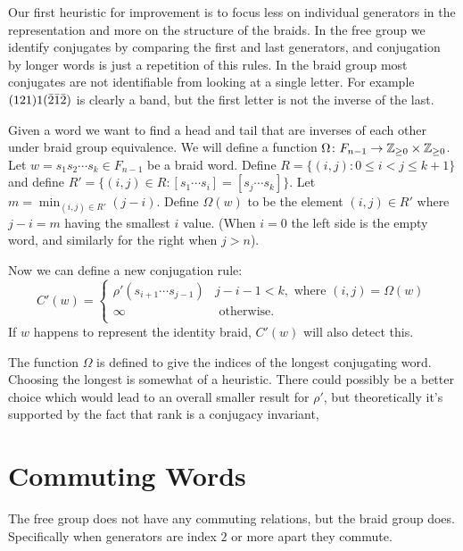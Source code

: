 \documentclass[12pt]{thesis}
\begin{document}
Our first heuristic for improvement is to focus less on individual generators in the representation
and more on the structure of the braids.
In the free group we identify conjugates by comparing the first and last generators,
and conjugation by longer words is just a repetition of this rules.
In the braid group most conjugates are not identifiable from looking at a single
letter.
For example $(1 2 1) 1 (\bar{2} \bar{1} \bar{2})$ is clearly a band,
but the first letter is not the inverse of the last.

Given a word  we want to find a head
and tail that are inverses of each other under braid group equivalence.
We will define a function $\Omega \colon F_{n-1} \rightarrow \mathbb{Z}_{\geq 0} \times \mathbb{Z}_{\geq 0}$.
Let $w = s_{1}s_{2} \cdots  s_{k} \in F_{n-1}$ be a braid word.
Define $R = \{ (i, j) \colon  0 \leq i < j \leq k + 1 \}$ 
and define $R' = \{ (i, j) \in R \colon [s_{1}\cdots s_{i}] = [s_{j} \cdots s_{k}] \}$.
Let $m = \min_{(i, j) \in R'} (j - i)$.
Define $\Omega(w)$ to be the element $(i, j) \in R'$
where $j - i = m$ having the smallest $i$ value.
(When $i = 0$ the left side is the empty word, and similarly for the right when $j > n$).

Now we can define a new conjugation rule:
\begin{equation}
    \label{modified-conjugation-rule}
    C'(w) = \begin{cases}
        \rho'(s_{i + 1} \cdots s_{j - 1}) & j - i - 1 < k, \text { where } (i, j) = \Omega(w) \\
               \infty & \text{ otherwise. } \\
          \end{cases}
\end{equation}
If $w$ happens to represent the identity braid, $C'(w)$ will also detect this.

The function $\Omega$ is defined to give the indices of the longest
conjugating word.
Choosing the longest is somewhat of a heuristic.
There could possibly be a better choice which would lead to an overall smaller result for $\rho'$,
but theoretically it's supported by the fact that rank is a conjugacy invariant,

\section{Commuting Words}

The free group does not have any commuting relations,
but the braid group does.
Specifically when generators are index $2$ or more apart they commute.
\end{document}
